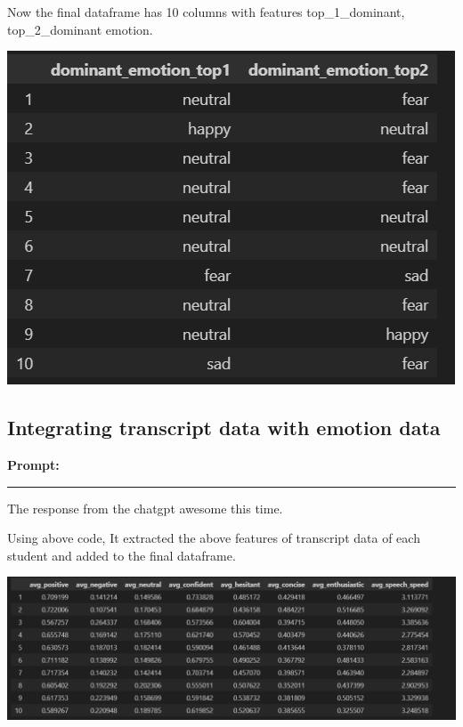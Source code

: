 \documentclass[11pt,a4paper]{article}
\begin{document}
\large{

Now the final dataframe has 10 columns with features top\_1\_dominant, top\_2\_dominant emotion.}
\begin{center}
    \includegraphics[width=1\columnwidth]{images_prompts/dominant_emotion.png}
\end{center}

\subsection{Integrating transcript data with emotion data}

\textbf{Prompt:}
\begin{tcolorbox}[title='Prompt']
    
\end{tcolorbox}
\begin{center}
    \color{red}\rule{1\linewidth}{0.5mm}
\end{center}

\begin{responsebox}
    The response from the chatgpt awesome this time.
\end{responsebox}

\begin{tcolorbox}
    
\end{tcolorbox}

\large{Using above code, It extracted the above features of transcript data of each student and added to the final dataframe.}
\begin{center}
    \includegraphics[width=1\columnwidth]{images_prompts/trans_df.png}
\end{center}
\end{document}
